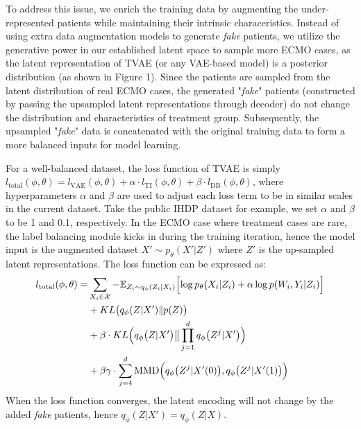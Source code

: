 To address this issue, we enrich the training data by augmenting the under-represented patients while maintaining their intrinsic characeristics. Instead of using extra data augmentation models \cite{sandfort2019gan,wang2020deepgenerative} to generate \textit{fake} patients, we utilize the generative power in our established latent space to sample more ECMO cases, as the latent representation of TVAE (or any VAE-based model) is a posterior distribution (as shown in Figure 1). Since the patients are sampled from the latent distribution of real ECMO cases, the generated "\textit{fake}" patients (constructed by passing the upsampled latent representations through decoder) do not change the distribution and characteristics of treatment group. Subsequently, the upsampled "\textit{fake}" data is concatenated with the original training data to form a more balanced inputs for model learning. 

For a well-balanced dataset, the loss function of TVAE is simply $
l_{\text{total}}(\phi,\theta) = l_{\text{VAE}}(\phi,\theta) + \alpha \cdot l_{\text{TI}}(\phi,\theta) + \beta \cdot l_{\text{DB}}(\phi,\theta)$, where hyperparameters $\alpha$ and $\beta$ are used to adjust each loss term to be in similar scales in the current dataset. Take the public IHDP dataset for example, we set $\alpha$ and $\beta$ to be 1 and 0.1, respectively. 
In the ECMO case where treatment cases are rare,  the label balancing module kicks in during the training iteration, hence the model input is the augmented dataset $X' \sim p_\theta(X'|Z')$ where $Z'$ is the up-sampled latent representations. The loss function can be expressed as:
\begin{equation}
    \begin{split}
    l_{\text{total}}(\phi,\theta) =& \sum_{X_i \in \mathcal{X}} -\mathbb{E}_{Z_i\sim q_{\phi}(Z_i|X_i) } \Bigl[\log p_{\theta} (X_i|Z_i) +
    \alpha\log p(W_i,Y_i|Z_i) \Bigr] \\
    &+ KL\bigl(q_{\phi}(Z|X') \| p(Z)\bigr) \\
    &+ \beta\cdot KL\Bigl(q_{{\phi}}\bigl(Z|X'\bigr)\big\|\prod_{j=1}^{d} q_{{\phi}}\bigl(Z^j|X'\bigr)\Bigr) \\
    &+ \beta\gamma\cdot\sum_{j=4}^{d}\text{MMD}\Bigl(q_{\phi}\bigl(Z^j|X'(0)\bigr),q_{\phi}\bigl(Z^j|X'(1)\bigr)\Bigr)
    \end{split}
\end{equation}
When the loss function converges, the latent encoding will not change by the added \textit{fake} patients, hence $ q_{\phi}(Z|X') =  q_{\phi}(Z|X)$. 



